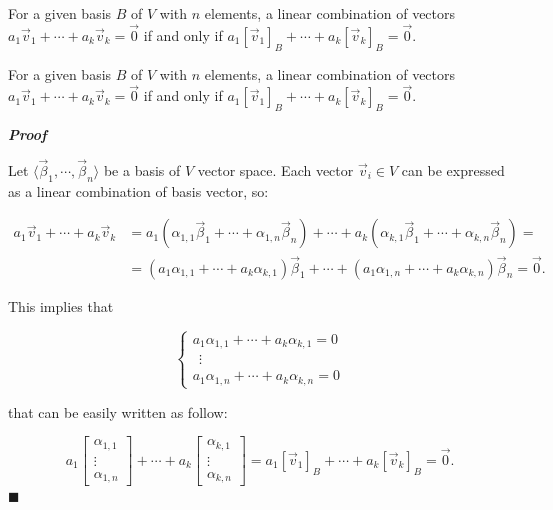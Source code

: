 For a given basis $B$ of $V$ with $n$ elements, a linear combination of vectors $a_1 \vec v_1 + \cdots + a_k \vec v_k= \vec 0$ if and only if $a_1 [\vec v_1]_B + \cdots + a_k [\vec v_k]_B = \vec 0$.

\begin{lemma}
    For a given basis $B$ of $V$ with $n$ elements, a linear combination of vectors $a_1 \vec v_1 + \cdots + a_k \vec v_k= \vec 0$ if and only if $a_1 [\vec v_1]_B + \cdots + a_k [\vec v_k]_B = \vec 0$.
\end{lemma}

\textbf{\textit{Proof}}

Let $\langle \vec \beta_1, \cdots, \vec \beta_n \rangle$ be a basis of $V$ vector space. Each vector $\vec v_i \in V$ can be expressed as a linear combination of basis vector, so:

\begin{align*}
a_1 \vec v_1 + \cdots + a_k \vec v_k &= a_1 (\alpha_{1,1} \vec \beta_1 + \cdots + \alpha_{1,n} \vec \beta_n) + \cdots + a_k (\alpha_{k,1} \vec \beta_1 + \cdots + \alpha_{k,n} \vec \beta_n) = \\
&=(a_1 \alpha_{1,1} + \cdots + a_k \alpha_{k,1}) \vec \beta_1 + \cdots + (a_1 \alpha_{1,n} + \cdots + a_k \alpha_{k,n}) \vec \beta_n = \vec 0.
\end{align*}

This implies that

$$
\begin{cases}
a_1 \alpha_{1,1} + \cdots + a_k \alpha_{k,1} = 0 \\
\ \ \vdots\\
a_1 \alpha_{1,n} + \cdots + a_k \alpha_{k,n} = 0
\end{cases}
$$

that can be easily written as follow:

$$
a_1 \begin{bmatrix}
\alpha_{1,1}\\
\vdots\\
\alpha_{1,n}
\end{bmatrix} + \cdots + a_{k} \begin{bmatrix}
\alpha_{k,1}\\
\vdots\\
\alpha_{k,n}
\end{bmatrix}
= a_1 [\vec v_1]_B + \cdots + a_k [\vec v_k]_B = \vec 0.
$$
$\blacksquare$

